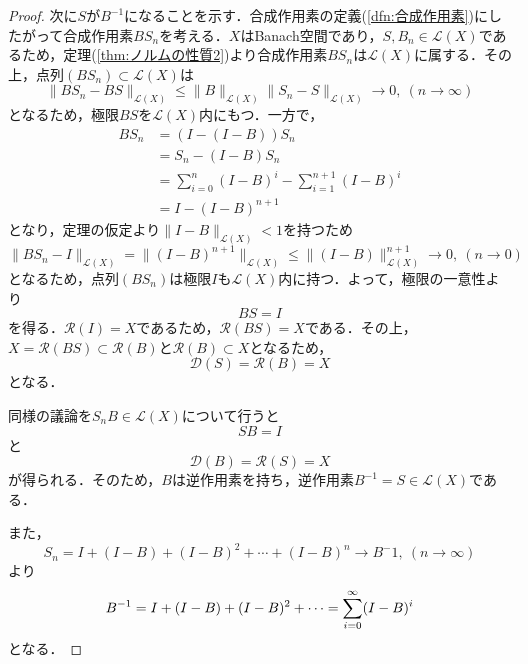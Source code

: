 \documentclass[11pt,a4paper]{jsarticle}
\theoremstyle{definition}
\begin{document}
\begin{proof}
  次に$S$が$B^{-1}$になることを示す．合成作用素の定義(\ref{dfn:合成作用素})にしたがって合成作用素$BS_n$を考える．$X$はBanach空間であり，$S,B_n\in\mathcal{L}(X)$であるため，定理(\ref{thm:ノルムの性質2})より合成作用素$BS_n$は$\mathcal{L}(X)$に属する．その上，点列$(BS_n)\subset\mathcal{L}(X)$は
  \begin{equation*}
    \|BS_n-BS\|_{\mathcal{L}(X)} \leq \|B\|_{\mathcal{L}(X)}\|S_n-S\|_{\mathcal{L}(X)}\rightarrow 0,\ (n\rightarrow \infty)
  \end{equation*}
  となるため，極限$BS$を$\mathcal{L}(X)$内にもつ．一方で，
  \begin{align*}
    BS_n & = (I-(I-B))S_n                                 \\
         & = S_n-(I-B)S_n                                 \\
         & = \sum^n_{i=0}(I-B)^i -\sum^{n+1}_{i=1}(I-B)^i \\
         & = I-(I-B)^{n+1}
  \end{align*}
  となり，定理の仮定より$\|I-B\|_{\mathcal{L}(X)}<1$を持つため
  \begin{equation*}
    \|BS_n-I\|_{\mathcal{L}(X)} = \|(I-B)^{n+1}\|_{\mathcal{L}(X)} \leq \|(I-B)\|^{n+1}_{\mathcal{L}(X)} \rightarrow 0,\ (n\rightarrow 0)
  \end{equation*}
  となるため，点列$(BS_n)$は極限$I$も$\mathcal{L}(X)$内に持つ．よって，極限の一意性より
  \begin{equation*}
    BS=I
  \end{equation*}
  を得る．$\mathcal{R}(I)=X$であるため，$\mathcal{R}(BS)=X$である．その上，$X=\mathcal{R}(BS)\subset \mathcal{R}(B)$と$\mathcal{R}(B)\subset X$となるため，
  \begin{equation*}
    \mathcal{D}(S)=\mathcal{R}(B)=X
  \end{equation*}
  となる．

  同様の議論を$S_nB\in\mathcal{L}(X)$について行うと
  \begin{equation*}
    SB=I
  \end{equation*}
  と
  \begin{equation*}
    \mathcal{D}(B)=\mathcal{R}(S)=X
  \end{equation*}
  が得られる．そのため，$B$は逆作用素を持ち，逆作用素$B^{-1}=S\in\mathcal{L}(X)$である．

  また，
  \begin{equation*}
    S_n=I+(I-B)+(I-B)^2+\cdots+(I-B)^n \rightarrow B^-1,\ (n\rightarrow\infty)
  \end{equation*}
  より
  \begin{equation*}
    B^{-1}=I+(I-B)+(I-B)^2+\cdots = \sum^{\infty}_{i=0}(I-B)^i\\
  \end{equation*}
  となる．


\end{proof}
\end{document}
